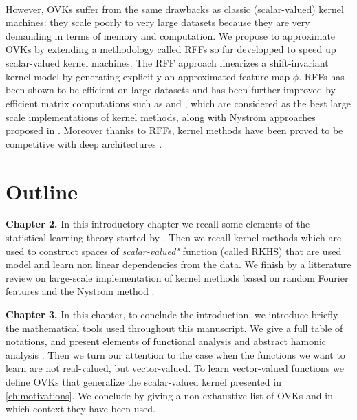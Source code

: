 \paragraph{}
However, \acsp{OVK} suffer from the same drawbacks as classic (scalar-valued)
kernel machines: they scale poorly to very large datasets because they are very
demanding in terms of memory and computation. We propose to approximate OVKs by
extending a methodology called \acfp{RFF} \citep{Rahimi2007, Le2013, Yang2015,
sriper2015, Bach2015, sutherland2015, rudi2016generalization} so far developped
to speed up scalar-valued kernel machines. The \acs{RFF} approach linearizes a
shift-invariant kernel model by generating explicitly an approximated feature
map $\tilde{\phi}$. \acsp{RFF} has been shown to be efficient on large datasets
and has been further improved by efficient matrix computations such as
\citep[``FastFood'']{Le2013} and \citep[``SORF'']{felix2016orthogonal}, which
are considered as the best large scale implementations of kernel methods, along
with Nystr\"om approaches proposed in \citet{drineas2005nystrom}. Moreover
thanks to \acsp{RFF}, kernel methods have been proved to be competitive with
deep architectures \citep{lu2014scale, dai2014scalable, yang2015deep}.

\section{Outline}
\textbf{Chapter 2.}
In this introductory chapter we recall some elements of the statistical
learning theory started by \citet{Vapnik1998}. Then we recall kernel methods
\citep{Aronszajn1950} which are used to construct spaces of
\emph{scalar-valued"} function (called RKHS) that are used model and learn non
linear dependencies from the data. We finish by a litterature review on
large-scale implementation of kernel methods based on random Fourier features
\citep{Rahimi2007} and the Nystr\"om method \citep{Williams2000-nystrom}.

\textbf{Chapter 3.}
In this chapter, to conclude the introduction, we introduce briefly the
mathematical tools used throughout this manuscript. We give a full table of
notations, and present elements of functional analysis
\citep{kurdila2006convex} and abstract hamonic analysis
\citep{folland1994course}. Then we turn our attention to the case when the
functions we want to learn are not real-valued, but vector-valued.  To learn
vector-valued functions we define \aclp{OVK} \citep{Micchelli2005, Carmeli2010}
that generalize the scalar-valued kernel presented in \cref{ch:motivations}. We
conclude by giving a non-exhaustive list of \aclp{OVK} and in which context
they have been used.

